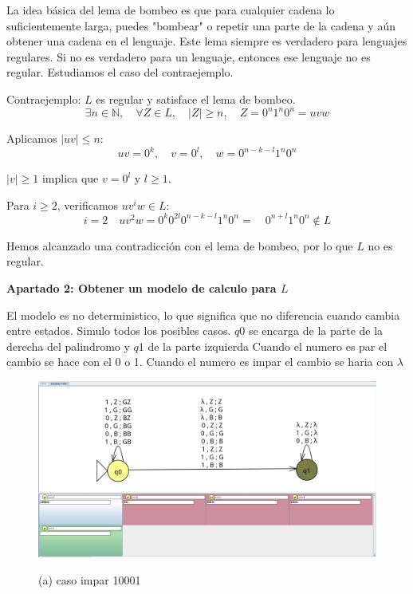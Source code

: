 \documentclass{article}
\begin{document}
        La idea básica del lema de bombeo es que para cualquier cadena lo suficientemente larga, 
        puedes "bombear" o repetir una parte de la cadena y 
        aún obtener una cadena en el lenguaje. 
        Este lema siempre es verdadero para lenguajes regulares. 
        Si no es verdadero para un lenguaje, entonces ese lenguaje 
        no es regular. Estudiamos el caso del contraejemplo.
        
        \vspace{\baselineskip} %
        
        
        Contraejemplo: \( L \) es regular y satisface el lema de bombeo.
        \[ \exists n \in \mathbb{N},\quad \forall Z \in L,\quad |Z| \geq n,\quad Z = 0^n 1^n 0^n = uvw \]
        
        
        Aplicamos \( |uv| \leq n \):
        \[ uv = 0^k, \quad v = 0^l, \quad w = 0^{n-k-l}1^n0^n \]
        
        \( |v| \geq 1 \) implica que \( v = 0^l \) y \( l \geq 1 \).
        \vspace{\baselineskip} %

        Para \( i \geq 2 \), verificamos \( uv^iw \in L \):
        \[ i = 2\quad  uv^2w = 0^k 0^{2l} 0^{n-k-l} 1^n 0^n =\quad 0^{n+l} 1^n 0^n \notin L \]
           
        Hemos alcanzado una contradicción con el lema de bombeo, por lo que \( L \) no es regular.
        
        \vspace{\baselineskip} %

        
        \newpage
        \textbf{Apartado 2: Obtener un modelo de calculo para $L$}         \vspace{\baselineskip} %

         El modelo es no deterministico, lo que significa que no diferencia cuando cambia entre estados. 
         Simulo todos los posibles casos.
         $q0$ se encarga de la parte de la derecha del palindromo y $q1$ de la parte izquierda 
         Cuando el numero es par el cambio se hace con el 0 o 1. Cuando el numero es impar el cambio se haria con $\lambda$ 
         
        \begin{figure}[!h]
            \centering
            \includegraphics[width=\textwidth]{./Imagenes/image30.png}  
            \label{fig:label4}
            \caption*{(a) caso impar 10001}
        \end{figure}
\end{document}
